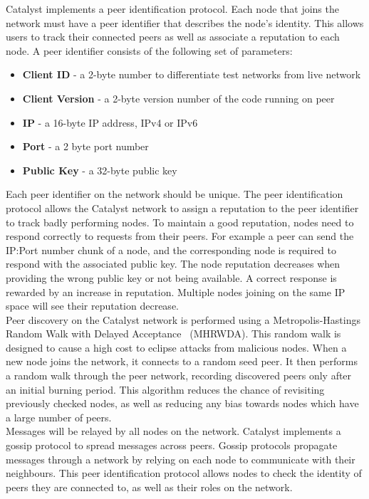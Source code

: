 Catalyst implements a peer identification protocol. Each node that joins the network must have a peer identifier that describes the node’s identity. This allows users to track their connected peers as well as associate a reputation to each node. A peer identifier consists of the following set of parameters:

\begin{itemize}
\item \textbf{Client ID} - a 2-byte number to differentiate test networks from live network
\item \textbf{Client Version} - a 2-byte version number of the code running on peer 
\item \textbf{IP} - a 16-byte IP address, IPv4 or IPv6
\item \textbf{Port} - a 2 byte port number 
\item \textbf{Public Key} - a 32-byte public key
\end{itemize}

Each peer identifier on the network should be unique. The peer identification protocol allows the Catalyst network to assign a reputation to the peer identifier to track badly performing nodes. To maintain a good reputation, nodes need to respond correctly to requests from their peers. For example a peer can send the IP:Port number chunk of a node, and the corresponding node is required to respond with the associated public key. The node reputation decreases when providing the wrong public key or not being available. A correct response is rewarded by an increase in reputation. Multiple nodes joining on the same IP space will see their reputation decrease. \\

Peer discovery on the Catalyst network is performed using a Metropolis-Hastings Random Walk with Delayed Acceptance~\cite{hasting} (MHRWDA). This random walk is designed to cause a high cost to eclipse attacks from malicious nodes. When a new node joins the network, it connects to a random seed peer. It then performs a random walk through the peer network, recording discovered peers only after an initial burning period. This algorithm reduces the chance of revisiting previously checked nodes, as well as reducing any bias towards nodes which have a large number of peers. \\

Messages will be relayed by all nodes on the network. Catalyst implements a gossip protocol to spread messages across peers. Gossip protocols propagate messages through a network by relying on each node to communicate with their neighbours. This peer identification protocol allows nodes to check the identity of peers they are connected to, as well as their roles on the network. 
